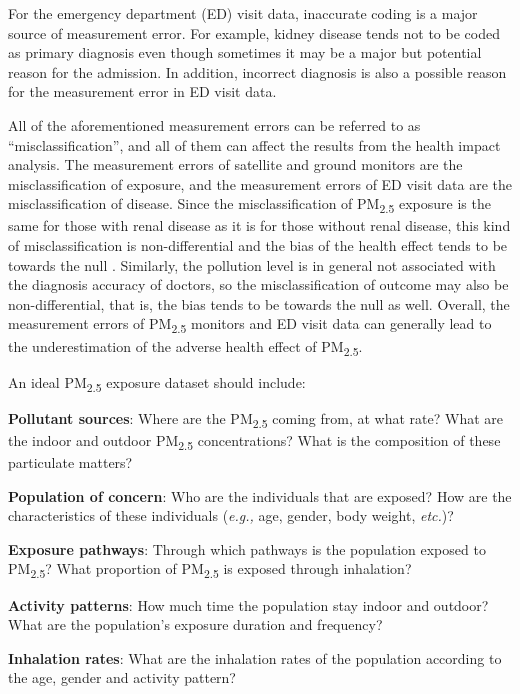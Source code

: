 \documentclass[11pt]{article}
\newcommand{\tsub}{\textsubscript}
\begin{document}
\begin{enumerate*}[{[a)]}]
    For the emergency department (ED) visit data, inaccurate coding is a major source of measurement error. For example, kidney disease tends not to be coded as primary diagnosis even though sometimes it may be a major but potential reason for the admission. In addition, incorrect diagnosis is also a possible reason for the measurement error in ED visit data. 
    
    \item All of the aforementioned measurement errors can be referred to as ``misclassification'', and all of them can affect the results from the health impact analysis. The measurement errors of satellite and ground monitors are the misclassification of exposure, and the measurement errors of ED visit data are the misclassification of disease. Since the misclassification of PM\tsub{2.5} exposure is the same for those with renal disease as it is for those without renal disease, this kind of misclassification is non-differential and the bias of the health effect tends to be towards the null \citep{sarnat2015fine}. Similarly, the pollution level is in general not associated with the diagnosis accuracy of doctors, so the misclassification of outcome may also be non-differential, that is, the bias tends to be towards the null as well. Overall, the measurement errors of PM\tsub{2.5} monitors and ED visit data can generally lead to the underestimation of the adverse health effect of PM\tsub{2.5}.
    
    \item An ideal PM\tsub{2.5} exposure dataset should include: {
        \begin{itemize*}
            \item \textbf{Pollutant sources}: Where are the PM\tsub{2.5} coming from, at what rate? What are the indoor and outdoor PM\tsub{2.5} concentrations? What is the composition of these particulate matters?
            \item \textbf{Population of concern}: Who are the individuals that are exposed? How are the characteristics of these individuals (\textit{e.g.,} age, gender, body weight, \textit{etc.})? 
            \item \textbf{Exposure pathways}: Through which pathways is the population exposed to PM\tsub{2.5}? What proportion of PM\tsub{2.5} is exposed through inhalation?
            \item \textbf{Activity patterns}: How much time the population stay indoor and outdoor? What are the population's exposure duration and frequency? 
            \item \textbf{Inhalation rates}: What are the inhalation rates of the population according to the age, gender and activity pattern?
        \end{itemize*}
    }
\end{enumerate*}
\end{document}
